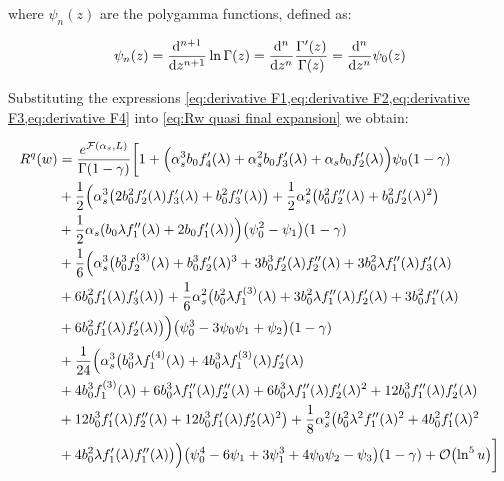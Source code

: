 \documentclass[../main.tex]{subfiles}
\begin{document}
where $\psi_n(z)$ are the polygamma functions, defined as:

\begin{equation}
    \psi_n (z) = \dv[n+1]{z} \ln \Gamma(z) = \dv[n]{z} \frac{\Gamma '(z)}{\Gamma(z)} = \dv[n]{z} \psi_0(z)
\end{equation}

Substituting the expressions \cref{eq:derivative F1,eq:derivative F2,eq:derivative F3,eq:derivative F4} into \cref{eq:Rw quasi final expansion} we obtain:

\begin{align}
    \begin{split}
        R^q(w) &= \frac{e^{\mathcal{F}(\alpha_s,L)}}{\Gamma(1-\gamma)} \biggl[ 1 + \Bigl(\alpha_s^3 b_0 f_4'(\lambda )+\alpha_s^2 b_0 f_3'(\lambda )+\alpha_s b_0 f_2'(\lambda )\Bigr) \psi_0(1-\gamma) \\
        &+ \frac{1}{2} \Bigl(\alpha_s^3 \bigl(2 b_0^2 f_2'(\lambda ) f_3'(\lambda )+b_0^2 f_3''(\lambda )\bigr)+ \frac{1}{2} \alpha_s^2 \qty(b_0^2 f_2''(\lambda )+b_0^2 f_2'(\lambda )^2 ) \\
        &+\frac{1}{2} \alpha_s \qty(b_0 \lambda  f_1''(\lambda ) + 2 b_0 f_1'(\lambda ) )\Bigr) \qty(\psi_0^2-\psi_1)(1-\gamma) \\
        &+ \frac{1}{6}\Bigl( \alpha_s^3 \bigl(b_0^3 f_2^{(3)}(\lambda )+b_0^3 f_2'(\lambda )^3 + 3 b_0^3 f_2'(\lambda ) f_2''(\lambda )+3 b_0^2 \lambda  f_1''(\lambda ) f_3'(\lambda ) \\
        &+6 b_0^2 f_1'(\lambda ) f_3'(\lambda )\bigr) +\frac{1}{6} \alpha_s^2 \bigl(b_0^2 \lambda  f_1^{(3)}(\lambda )+3 b_0^2 \lambda  f_1''(\lambda ) f_2'(\lambda )+3 b_0^2 f_1''(\lambda )\\
        &+6 b_0^2 f_1'(\lambda ) f_2'(\lambda )\bigr) \Bigr) \qty(\psi_0^3 -3 \psi_0\psi_1+\psi_2)(1-\gamma) \\
        &+ \frac{1}{24}\Bigl(\alpha_s^3 \bigl(b_0^3 \lambda  f_1^{(4)}(\lambda )+4 b_0^3 \lambda  f_1^{(3)}(\lambda ) f_2'(\lambda )\\
        &+4 b_0^3 f_1^{(3)}(\lambda )+6 b_0^3 \lambda  f_1''(\lambda ) f_2''(\lambda )+6 b_0^3 \lambda  f_1''(\lambda ) f_2'(\lambda )^2+12 b_0^3 f_1''(\lambda ) f_2'(\lambda )\\
        &+12 b_0^3 f_1'(\lambda ) f_2''(\lambda )+12 b_0^3 f_1'(\lambda ) f_2'(\lambda )^2\bigr)+\frac{1}{8} \alpha_s^2 \bigl(b_0^2 \lambda ^2 f_1''(\lambda )^2+4 b_0^2 f_1'(\lambda )^2\\
        &+4 b_0^2 \lambda  f_1'(\lambda ) f_1''(\lambda )\bigr)\Bigr) \qty(\psi_0^4 -6 \psi_1 + 3\psi_1^3 +4\psi_0\psi_2 -\psi_3)(1-\gamma)+ \order{\ln^5 u} \biggr]
    \end{split}
\end{align}
\end{document}
